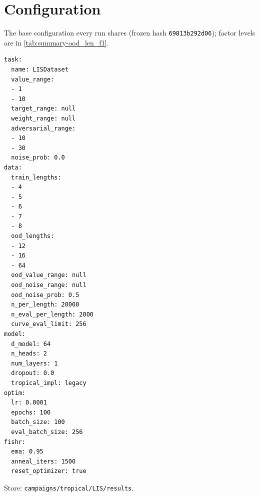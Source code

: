 \documentclass[10pt]{article}
\begin{document}
\section{Configuration}
The base configuration every run shares (frozen hash \texttt{69813b292d06}); factor levels are in \autoref{tab:summary-ood_len_f1}.
{\footnotesize
\begin{verbatim}
task:
  name: LISDataset
  value_range:
  - 1
  - 10
  target_range: null
  weight_range: null
  adversarial_range:
  - 10
  - 30
  noise_prob: 0.0
data:
  train_lengths:
  - 4
  - 5
  - 6
  - 7
  - 8
  ood_lengths:
  - 12
  - 16
  - 64
  ood_value_range: null
  ood_noise_range: null
  ood_noise_prob: 0.5
  n_per_length: 20000
  n_eval_per_length: 2000
  curve_eval_limit: 256
model:
  d_model: 64
  n_heads: 2
  num_layers: 1
  dropout: 0.0
  tropical_impl: legacy
optim:
  lr: 0.0001
  epochs: 100
  batch_size: 100
  eval_batch_size: 256
fishr:
  ema: 0.95
  anneal_iters: 1500
  reset_optimizer: true
\end{verbatim}
}
Store: \texttt{campaigns/tropical/LIS/results}.
\end{document}
